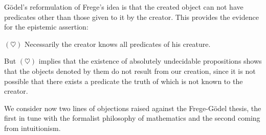 \documentclass[12pt]{article}
\begin{document}
G\"{o}del's reformulation of Frege's idea is that the created object can not have predicates other than those given to it by the creator. This provides the evidence for the epistemic assertion:

\begin{center}
$(\heartsuit)$ \qquad Necessarily the creator knows all predicates of his creature.
\end{center}

But $(\heartsuit)$ implies that the existence of absolutely undecidable propositions shows that the objects denoted by them do not result from our creation, since it is not possible that there exists a predicate the truth of which is not known to the creator.

We consider now two lines of objections raised against the Frege-G\"{o}del thesis, the first in tune with the formalist philosophy of mathematics and the second coming from intuitionism.
\end{document}
